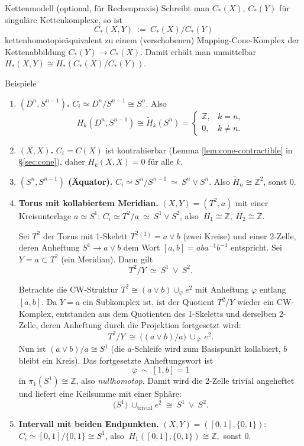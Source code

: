 \documentclass[10pt, letterpaper]{article}
\begin{document}
Kettenmodell (optional, für Rechenpraxis)
Schreibt man $C_*(X)$, $C_*(Y)$ für singuläre Kettenkomplexe, so ist
\[
  C_*(X,Y)\ :=\ C_*(X)/C_*(Y)
\]
kettenhomotopieäquivalent zu einem (verschobenen) Mapping-Cone-Komplex der Kettenabbildung $C_*(Y)\to C_*(X)$. Damit erhält man unmittelbar $H_*(X,Y)\cong H_*(C_*(X)/C_*(Y))$.

Beispiele
\begin{enumerate}
  \item \textbf{$(D^n,S^{n-1})$.} \quad
  $C_i\simeq D^n/S^{n-1}\cong S^n$. Also
  \[
    H_k(D^n,S^{n-1})\cong \widetilde H_k(S^n)=
    \begin{cases}\mathbb Z,&k=n,\\ 0,&k\neq n.\end{cases}
  \]
  \item \textbf{$(X,X)$.}\quad
  $C_i=C(X)$ ist kontrahierbar (Lemma \ref{lem:cone-contractible} in \S\ref{sec:cone}), daher $H_k(X,X)=0$ für alle $k$.
  \item \textbf{$(S^n,S^{n-1})$ (Äquator).}\quad
  $C_i\simeq S^n/S^{n-1}\ \simeq\ S^n\vee S^n$. Also $\widetilde H_n\cong \mathbb Z^2$, sonst $0$.
  \item \textbf{Torus mit kollabiertem Meridian.}\quad
  $(X,Y)=(T^2,a)$ mit einer Kreisunterlage $a\simeq S^1$:
  $C_i\simeq T^2/a\ \simeq\ S^1\vee S^2$, also
  \(\ H_1\cong\mathbb Z,\ H_2\cong\mathbb Z.\)

  Sei $T^2$ der Torus mit 1-Skelett $T^2{}^{(1)}=a\vee b$ (zwei Kreise) und einer 2-Zelle, deren Anheftung $S^1\to a\vee b$ dem Wort $[a,b]=aba^{-1}b^{-1}$ entspricht. Sei $Y=a\subset T^2$ (ein Meridian). Dann gilt
  \[
    T^2 / Y\ \simeq\ S^1\ \vee\ S^2.
  \]

  Betrachte die CW-Struktur $T^2 \cong (a\vee b)\cup_\varphi e^2$ mit Anheftung $\varphi$ entlang $[a,b]$.
  Da $Y=a$ ein Subkomplex ist, ist der Quotient $T^2/Y$ wieder ein CW-Komplex, entstanden aus dem Quotienten des 1-Skeletts und derselben 2-Zelle, deren Anheftung durch die Projektion fortgesetzt wird:
  \[
    T^2/Y\ \cong\ \big((a\vee b)/a\big)\ \cup_{\ \bar\varphi\ } e^2.
  \]
  Nun ist $(a\vee b)/a \cong S^1$ (die $a$-Schleife wird zum Basispunkt kollabiert, $b$ bleibt ein Kreis). Das fortgesetzte Anheftungswort ist
  \[
    \bar\varphi\ \sim\ [1,b]=1
  \]
  in $\pi_1(S^1)\cong\mathbb Z$, also \emph{nullhomotop}. Damit wird die 2-Zelle trivial angeheftet und liefert eine Keilsumme mit einer Sphäre:
  \[
    \big(S^1\big)\ \cup_{\text{trivial}} e^2\ \cong\ S^1\ \vee\ S^2.
  \]
  \item \textbf{Intervall mit beiden Endpunkten.}\quad
  $(X,Y)=([0,1],\{0,1\})$: $C_i\simeq [0,1]/\{0,1\}\cong S^1$, also
  \(\ H_1([0,1],\{0,1\})\cong \mathbb Z,\) sonst $0$.
\end{enumerate}
\end{document}
